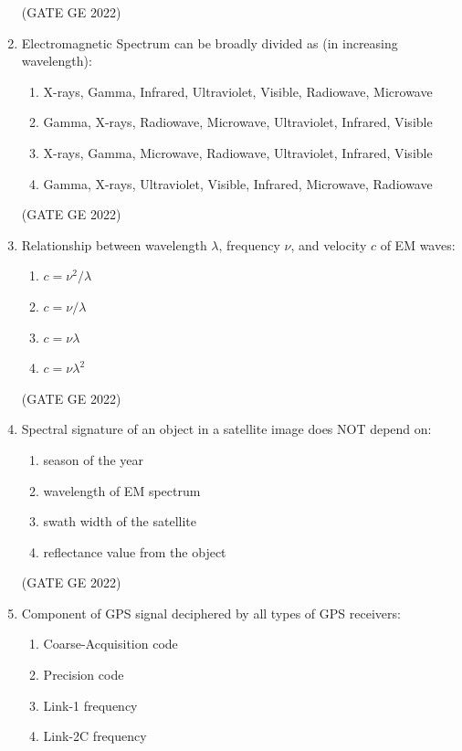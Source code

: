 \documentclass[journal,12pt,onecolumn]{IEEEtran}
\theoremstyle{remark}
\begin{document}
\begin{enumerate}
\hfill (GATE GE 2022)

\item Electromagnetic Spectrum can be broadly divided as (in increasing wavelength):
\begin{enumerate}
    \item X-rays, Gamma, Infrared, Ultraviolet, Visible, Radiowave, Microwave
    \item Gamma, X-rays, Radiowave, Microwave, Ultraviolet, Infrared, Visible
    \item X-rays, Gamma, Microwave, Radiowave, Ultraviolet, Infrared, Visible
    \item Gamma, X-rays, Ultraviolet, Visible, Infrared, Microwave, Radiowave
\end{enumerate}

\hfill (GATE GE 2022)

\item Relationship between wavelength $\lambda$, frequency $\nu$, and velocity $c$ of EM waves:
\begin{enumerate}
    \item $c = \nu^2 / \lambda$
    \item $c = \nu / \lambda$
    \item $c = \nu \lambda$
    \item $c = \nu \lambda^2$
\end{enumerate}

\hfill (GATE GE 2022)

\item Spectral signature of an object in a satellite image does NOT depend on:
\begin{enumerate}
    \item season of the year
    \item wavelength of EM spectrum
    \item swath width of the satellite
    \item reflectance value from the object
\end{enumerate}

\hfill (GATE GE 2022)

\item Component of GPS signal deciphered by all types of GPS receivers:
\begin{enumerate}
    \item Coarse-Acquisition code
    \item Precision code
    \item Link-1 frequency
    \item Link-2C frequency
\end{enumerate}


\end{enumerate}
\end{document}
